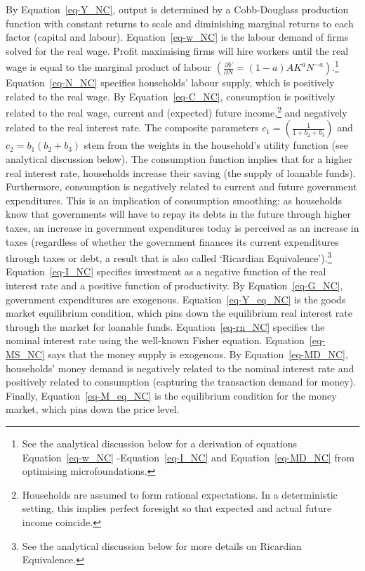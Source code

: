 \documentclass[
  letterpaper,
  DIV=11,
  numbers=noendperiod]{scrreprt}
\begin{document}
By Equation~\ref{eq-Y_NC}, output is determined by a Cobb-Douglass
production function with constant returns to scale and diminishing
marginal returns to each factor (capital and labour).
Equation~\ref{eq-w_NC} is the labour demand of firms solved for the real
wage. Profit maximising firms will hire workers until the real wage is
equal to the marginal product of labour
\(\left(\frac{\partial Y}{\partial N}=(1-a)AK^aN^{-a}\right)\).\footnote{See
  the analytical discussion below for a derivation of equations
  Equation~\ref{eq-w_NC} -Equation~\ref{eq-I_NC} and
  Equation~\ref{eq-MD_NC} from optimising microfoundations.}
Equation~\ref{eq-N_NC} specifies households' labour supply, which is
positively related to the real wage. By Equation~\ref{eq-C_NC},
consumption is positively related to the real wage, current and
(expected) future income,\footnote{Households are assumed to form
  rational expectations. In a deterministic setting, this implies
  perfect foresight so that expected and actual future income coincide.}
and negatively related to the real interest rate. The composite
parameters \(c_1= \left(\frac{1}{1+b_2+b_3}\right)\) and
\(c_2= b_1(b_2+b_3)\) stem from the weights in the household's utility
function (see analytical discussion below). The consumption function
implies that for a higher real interest rate, households increase their
saving (the supply of loanable funds). Furthermore, consumption is
negatively related to current and future government expenditures. This
is an implication of consumption smoothing: as households know that
governments will have to repay its debts in the future through higher
taxes, an increase in government expenditures today is perceived as an
increase in taxes (regardless of whether the government finances its
current expenditures through taxes or debt, a result that is also called
`Ricardian Equivalence').\footnote{See the analytical discussion below
  for more details on Ricardian Equivalence.} Equation~\ref{eq-I_NC}
specifies investment as a negative function of the real interest rate
and a positive function of productivity. By Equation~\ref{eq-G_NC},
government expenditures are exogenous. Equation~\ref{eq-Y_eq_NC} is the
goods market equilibrium condition, which pins down the equilibrium real
interest rate through the market for loanable funds.
Equation~\ref{eq-rn_NC} specifies the nominal interest rate using the
well-known Fisher equation. Equation~\ref{eq-MS_NC} says that the money
supply is exogenous. By Equation~\ref{eq-MD_NC}, households' money
demand is negatively related to the nominal interest rate and positively
related to consumption (capturing the transaction demand for money).
Finally, Equation~\ref{eq-M_eq_NC} is the equilibrium condition for the
money market, which pins down the price level.
\end{document}
